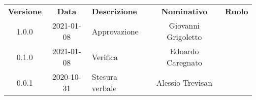 {
    \renewcommand{\arraystretch}{1.5}
    \centering
    \begin{longtable}{ c c  C{4cm}  c  c }
        \rowcolor{\primaryColor}
        \textcolor{\secondaryColor}{
        \textbf{Versione}}     & \textcolor{\secondaryColor}{\textbf{Data}}       & \textcolor{\secondaryColor}
        {\textbf{Descrizione}} & \textcolor{\secondaryColor}{\textbf{Nominativo}} & \textcolor{\secondaryColor}{\textbf{Ruolo}}                          \\


        1.0.0                  & 2021-01-08                                       & Approvazione                                & Giovanni Grigoletto & \responsabile{} \\
        0.1.0                  & 2021-01-08                                       & Verifica                                    & Edoardo Caregnato & \verificatore{} \\
        0.0.1                  & 2020-10-31                                      & Stesura verbale                           & Alessio Trevisan & \redattore{}    \\
    \end{longtable}
}